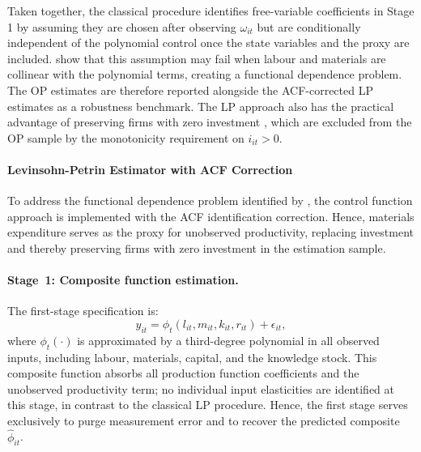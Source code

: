 \documentclass[a4paper, 12pt]{article}
\begin{document}
Taken together, the classical \textcite{olley1992dynamics} procedure identifies free-variable coefficients in Stage 1 by assuming they are chosen after observing $\omega_{it}$ but are conditionally independent of the polynomial control once the state variables and the proxy are included. \textcite{ackerberg2015identification} show that this assumption may fail when labour and materials are collinear with the polynomial terms, creating a functional dependence problem. The OP estimates are therefore reported alongside the ACF-corrected LP estimates as a robustness benchmark. The LP approach also has the practical advantage of preserving firms with zero investment \parencite{bondarkov2025russian}, which are excluded from the OP sample by the monotonicity requirement on $i_{it} > 0$.


\paragraph{Levinsohn-Petrin Estimator with ACF Correction}

To address the functional dependence problem identified by \textcite{ackerberg2015identification}, the \textcite{levinsohn2003estimating} control function approach is implemented with the ACF identification correction. Hence, materials expenditure serves as the proxy for unobserved productivity, replacing investment and thereby preserving firms with zero investment in the estimation sample.

\paragraph{Stage~1: Composite function estimation.}
The first-stage specification is:
\begin{equation}
y_{it} = \phi_t(l_{it}, m_{it}, k_{it}, r_{it}) + \epsilon_{it},
\end{equation}
where $\phi_t(\cdot)$ is approximated by a third-degree polynomial in all observed inputs, including labour, materials, capital, and the knowledge stock. This composite function absorbs all production function coefficients and the unobserved productivity term; no individual input elasticities are identified at this stage, in contrast to the classical LP procedure. Hence, the first stage serves exclusively to purge measurement error and to recover the predicted composite $\hat{\phi}_{it}$.
\end{document}
